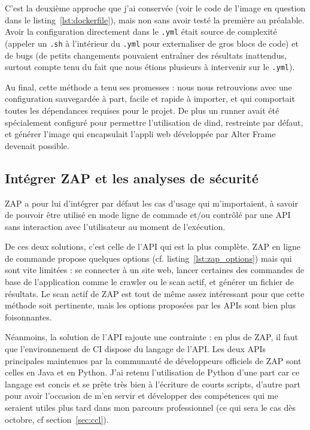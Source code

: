 C'est la deuxième approche que j'ai conservée (voir le code de l'image en question dans le listing~\ref{lst:dockerfile}), mais non sans avoir testé la première au préalable. Avoir la configuration directement dans le \verb|.yml| était source de complexité (appeler un \verb|.sh| à l'intérieur du \verb|.yml| pour externaliser de gros blocs de code) et de bugs (de petits changements pouvaient entraîner des résultats inattendus, surtout compte tenu du fait que nous étions plusieurs à intervenir sur le \verb|.yml|).

Au final, cette méthode a tenu ses promesses : nous nous retrouvions avec une configuration sauvegardée à part, facile et rapide à importer, et qui comportait toutes les dépendances requises pour le projet. De plus un runner avait été spécialement configuré pour permettre l'utilisation de dind, restreinte par défaut, et générer l'image qui encapsulait l'appli web développée par Alter Frame devenait possible.

\subsection{Intégrer ZAP et les analyses de sécurité}
ZAP a pour lui d'intégrer par défaut les cas d'usage qui m'importaient, à savoir de pouvoir être utilisé en mode ligne de commade et/ou contrôlé par une API sans interaction avec l'utilisateur au moment de l'exécution.

De ces deux solutions, c'est celle de l'API qui est la plus complète. ZAP en ligne de commande propose quelques options (cf. listing~\ref{lst:zap_options}) mais qui sont vite limitées : se connecter à un site web, lancer certaines des commandes de base de l'application comme le crawler ou le scan actif, et générer un fichier de résultats. Le scan actif de ZAP est tout de même assez intéressant pour que cette méthode soit pertinente, mais les options proposées par les APIs sont bien plus foisonnantes.

Néanmoins, la solution de l'API rajoute une contrainte : en plus de ZAP, il faut que l'environnement de CI dispose du langage de l'API. Les deux APIs principales maintenues par la communauté de développeurs \og officiels \fg{} de ZAP sont celles en Java et en Python. J'ai retenu l'utilisation de Python d'une part car ce langage est concis et se prête très bien à l'écriture de courts scripts, d'autre part pour avoir l'occasion de m'en servir et développer des compétences qui me seraient utiles plus tard dans mon parcours professionnel (ce qui sera le cas dès octobre, cf section~\ref{sec:ccl}).

